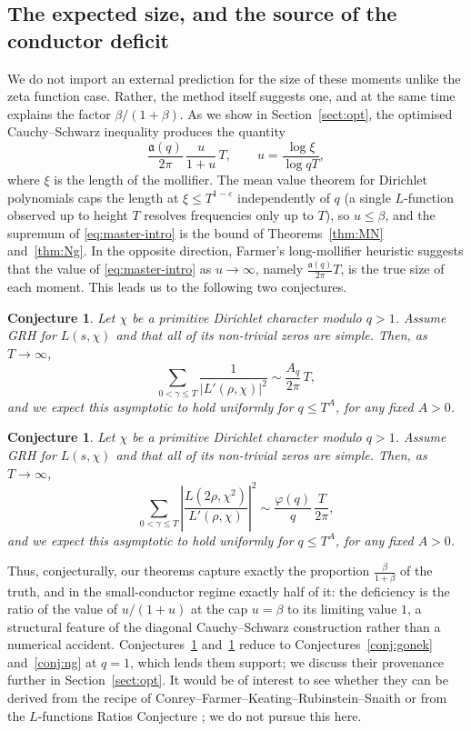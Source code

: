 \documentclass[10pt,a4paper]{amsart}
\newtheorem{conjecture}[theorem]{Conjecture}
\numberwithin{equation}{section}
\begin{document}
\subsection{The expected size, and the source of the conductor deficit}\label{subsect:expected}
We do not import an external prediction for the size of these moments unlike the zeta function case. Rather, the method itself suggests one, and at the same time explains the factor $\beta/(1+\beta)$. As we show in Section~\ref{sect:opt}, the optimised Cauchy--Schwarz inequality produces the quantity
\begin{equation}\label{eq:master-intro}
\frac{\mathfrak a(q)}{2\pi}\,\frac{u}{1+u}\,T,
\qquad
u=\frac{\log\xi}{\log qT},
\end{equation}
where $\xi$ is the length of the mollifier. The mean value theorem for Dirichlet polynomials caps the length at $\xi\le T^{1-\varepsilon}$ independently of $q$ (a single $L$-function observed up to height $T$ resolves frequencies only up to $T$), so $u\le\beta$, and the supremum of \eqref{eq:master-intro} is the bound of Theorems~\ref{thm:MN} and~\ref{thm:Ng}. In the opposite direction, Farmer's long-mollifier heuristic \cite{Farmer} suggests that the value of \eqref{eq:master-intro} as $u\to\infty$, namely $\tfrac{\mathfrak a(q)}{2\pi}T$, is the true size of each moment. This leads us to the following two conjectures.

\begin{conjecture}\label{conj:dirMN}
Let $\chi$ be a primitive Dirichlet character modulo $q>1$. Assume GRH for $L(s,\chi)$ and that all of its non-trivial zeros are simple. Then, as $T\to\infty$,
\[
\sum_{0<\gamma\le T}\frac{1}{|L'(\rho,\chi)|^2}\sim\frac{A_q}{2\pi}\,T,
\]
and we expect this asymptotic to hold uniformly for $q\le T^{A}$, for any fixed $A>0$.
\end{conjecture}

\begin{conjecture}\label{conj:dirNg}
Let $\chi$ be a primitive Dirichlet character modulo $q>1$. Assume GRH for $L(s,\chi)$ and that all of its non-trivial zeros are simple. Then, as $T\to\infty$,
\[
\sum_{0<\gamma\le T}\left|\frac{L(2\rho,\chi^2)}{L'(\rho,\chi)}\right|^2\sim\frac{\varphi(q)}{q}\,\frac{T}{2\pi},
\]
and we expect this asymptotic to hold uniformly for $q\le T^{A}$, for any fixed $A>0$.
\end{conjecture}

Thus, conjecturally, our theorems capture exactly the proportion $\tfrac{\beta}{1+\beta}$ of the truth, and in the small-conductor regime exactly half of it: the deficiency is the ratio of the value of $u/(1+u)$ at the cap $u=\beta$ to its limiting value $1$, a structural feature of the diagonal Cauchy--Schwarz construction rather than a numerical accident. Conjectures~\ref{conj:dirMN} and~\ref{conj:dirNg} reduce to Conjectures~\ref{conj:gonek} and~\ref{conj:ng} at $q=1$, which lends them support; we discuss their provenance further in Section~\ref{sect:opt}. It would be of interest to see whether they can be derived from the recipe of Conrey--Farmer--Keating--Rubinstein--Snaith \cite{CFKRS} or from the $L$-functions Ratios Conjecture \cite{CFZ,ConreySnaith}; we do not pursue this here.
\end{document}
